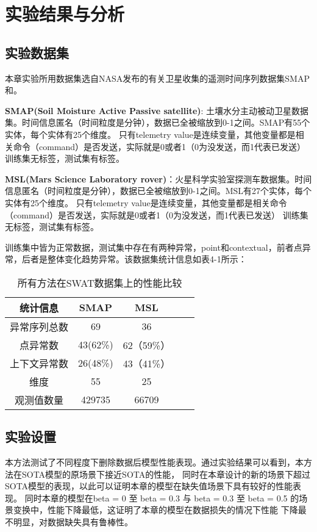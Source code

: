 \section{实验结果与分析}

\subsection{实验数据集}
本章实验所用数据集选自NASA发布的有关卫星收集的遥测时间序列数据集SMAP和\cite{msl}。

\textbf{SMAP(Soil Moisture Active Passive satellite)}: 土壤水分主动被动卫星数据集。时间信息匿名（时间粒度是分钟），数据已全被缩放到0-1之间。SMAP有55个实体，每个实体有25个维度。
只有telemetry value是连续变量，其他变量都是相关命令（command）是否发送，实际就是0或者1（0为没发送，而1代表已发送）
训练集无标签，测试集有标签。

\textbf{MSL(Mars Science Laboratory rover)}：火星科学实验室探测车数据集。时间信息匿名（时间粒度是分钟），数据已全被缩放到0-1之间。MSL有27个实体，每个实体有25个维度。
只有telemetry value是连续变量，其他变量都是相关命令（command）是否发送，实际就是0或者1（0为没发送，而1代表已发送）
训练集无标签，测试集有标签。

训练集中皆为正常数据，测试集中存在有两种异常，point和contextual，前者点异常，后者是整体变化趋势异常。该数据集统计信息如表4-1所示：
\begin{table}[htbp]
    \caption{所有方法在SWAT数据集上的性能比较}
    \vspace{0.5em}\centering\wuhao
    \begin{tabular}{ccccc}
    \toprule
    统计信息 & SMAP & MSL & \\
    \midrule
    异常序列总数	& 69	& 36 \\
    点异常数	& 43(62\%)	& 62（59\%）\\ 
    上下文异常数	& 26(48\%)	& 43（41\%） \\
    维度	& 55	& 25\\
    观测值数量	& 429735	& 66709 \\
    \bottomrule
    \end{tabular}
    \end{table}

\subsection{实验设置}
本方法测试了不同程度下删除数据后模型性能表现。通过实验结果可以看到，本方法在SOTA模型的原场景下接近SOTA的性能，
同时在本章设计的新的场景下超过SOTA模型的表现，以此可以证明本章的模型在缺失值场景下具有较好的性能表现。
同时本章的模型在beta = 0 至 beta = 0.3 与 beta = 0.3 至 beta = 0.5 的场景变换中，性能下降最低，这证明了本章的模型在数据损失的情况下性能
下降最不明显，对数据缺失具有鲁棒性。

